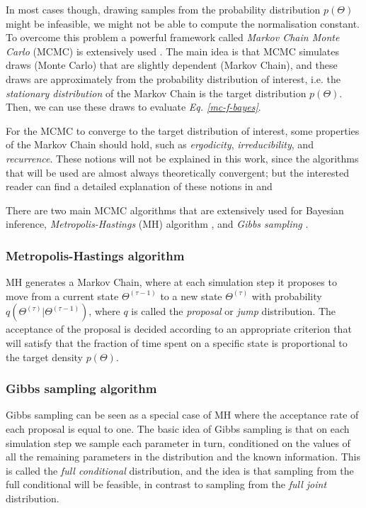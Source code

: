 In most cases though, drawing samples from the probability distribution $p(\Theta)$ might be infeasible, \eg we might not be able to compute the normalisation constant. To overcome this problem a powerful framework called \emph{Markov Chain Monte Carlo} (MCMC) is extensively used \citep{Neal1998}. The main idea is that MCMC simulates draws (\ie Monte Carlo) that are slightly dependent (\ie Markov Chain), and these draws are approximately from the probability distribution of interest, i.e. the \emph{stationary distribution} of the Markov Chain is the target distribution $p(\Theta)$. Then, we can use these draws to evaluate \emph{Eq. \ref{mc-f-bayes}}.

For the MCMC to converge to the target distribution of interest, some properties of the Markov Chain should hold, such as \emph{ergodicity}, \emph{irreducibility}, and \emph{recurrence}. These notions will not be explained in this work, since the algorithms that will be used are almost always theoretically convergent; but the interested reader can find a detailed explanation of these notions in \citet{Robert1999} and \citet{Liu2001}

There are two main MCMC algorithms that are extensively used for Bayesian inference, \emph{Metropolis-Hastings} (MH) algorithm \citep{Metropolis1953, Hastings1970}, and \emph{Gibbs sampling} \citep{Geman1984, Gelfand1990}. 

\subsubsection*{Metropolis-Hastings algorithm}
MH generates a Markov Chain, where at each simulation step it proposes to move from a current state $\Theta^{(\tau-1)}$ to a new state $\Theta^{(\tau)}$ with probability $q(\Theta^{(\tau)}|\Theta^{(\tau -1)})$, where $q$ is called the \emph{proposal} or \emph{jump} distribution. The acceptance of the proposal is decided according to an appropriate criterion that will satisfy that the fraction of time spent on a specific state is proportional to the target density $p(\Theta)$.

\subsubsection*{Gibbs sampling algorithm}
Gibbs sampling can be seen as a special case of MH where the acceptance rate of each proposal is equal to one. The basic idea of Gibbs sampling is that on each simulation step we sample each parameter in turn, conditioned on the values of all the remaining parameters in the distribution and the known information. This is called the \emph{full conditional} distribution, and the idea is that sampling from the full conditional will be feasible, in contrast to sampling from the \emph{full joint} distribution.

